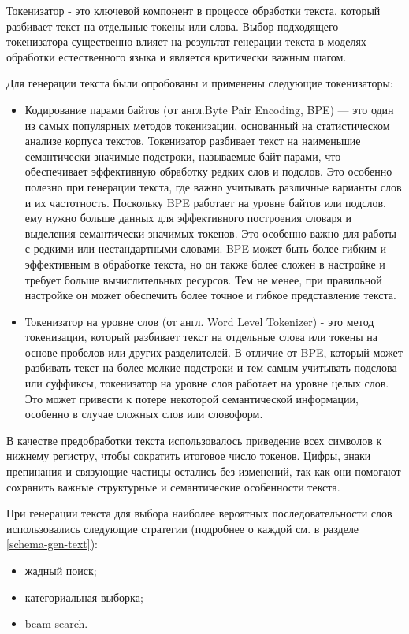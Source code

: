 \documentclass[a4paper,12pt]{extarticle}
\begin{document}
Токенизатор - это ключевой компонент в процессе обработки текста, который разбивает текст на отдельные токены или слова. Выбор подходящего токенизатора существенно влияет на результат генерации текста в моделях обработки естественного языка и является критически важным шагом.

Для генерации текста были опробованы и применены следующие токенизаторы:
\begin{itemize}
	\item Кодирование парами байтов (от англ.Byte Pair Encoding, BPE) — это один из самых популярных методов токенизации, основанный на статистическом анализе корпуса текстов. Токенизатор разбивает текст на наименьшие семантически значимые подстроки, называемые байт-парами, что обеспечивает эффективную обработку редких слов и подслов. Это особенно полезно при генерации текста, где важно учитывать различные варианты слов и их частотность. Поскольку BPE работает на уровне байтов или подслов, ему нужно больше данных для эффективного построения словаря и выделения семантически значимых токенов. Это особенно важно для работы с редкими или нестандартными словами. BPE может быть более гибким и эффективным в обработке текста, но он также более сложен в настройке и требует больше вычислительных ресурсов. Тем не менее, при правильной настройке он может обеспечить более точное и гибкое представление текста.
	\item Токенизатор на уровне слов (от англ. Word Level Tokenizer) - это метод токенизации, который разбивает текст на отдельные слова или токены на основе пробелов или других разделителей. В отличие от BPE, который может разбивать текст на более мелкие подстроки и тем самым учитывать подслова или суффиксы, токенизатор на уровне слов работает на уровне целых слов. Это может привести к потере некоторой семантической информации, особенно в случае сложных слов или словоформ.
\end{itemize}

В качестве предобработки текста использовалось приведение всех символов к нижнему регистру, чтобы сократить итоговое число токенов. Цифры, знаки препинания и связующие частицы остались без изменений, так как они помогают сохранить важные структурные и семантические особенности текста.

При генерации текста для выбора наиболее вероятных последовательности слов использовались следующие стратегии (подробнее о каждой см. в разделе \ref{schema-gen-text}):
\begin{itemize}
	\item жадный поиск;
	\item категориальная выборка;
	\item beam search.
\end{itemize}
\end{document}
